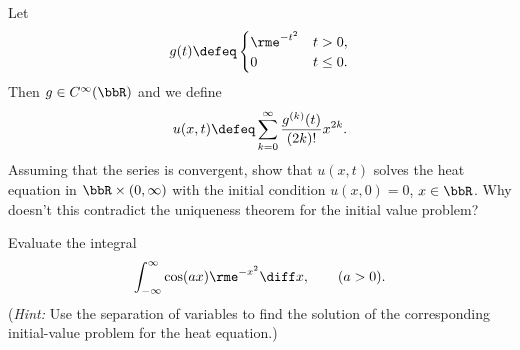 \begin{problem}
  Let
  \[
    g(t)\defeq
    \begin{cases}
      \rme^{-t^2}&t>0,\\
      0&t\leq 0.
    \end{cases}
  \]
  Then \(g\in C^\infty(\bbR)\) and we define
  \[
    u(x,t)\defeq\sum_{k=0}^\infty\frac{g^{(k)}(t)}{(2k)!}x^{2k}.
  \]
  Assuming that the series is convergent, show that \(u(x,t)\) solves the
  heat equation in \(\bbR\times(0,\infty)\) with the initial condition
  \(u(x,0)=0\), \(x\in\bbR\). Why doesn't this contradict the uniqueness
  theorem for the initial value problem?
\end{problem}
\begin{solution}
\end{solution}
\newpage

\begin{problem}
  Evaluate the integral
  \[
    \int_{-\infty}^\infty \cos(ax)\rme^{-x^2}\diff x,\qquad (a>0).
  \]
  \noindent (\emph{Hint:} Use the separation of variables to find the
  solution of the corresponding initial-value problem for the heat
  equation.)
\end{problem}
\begin{solution}
\end{solution}

